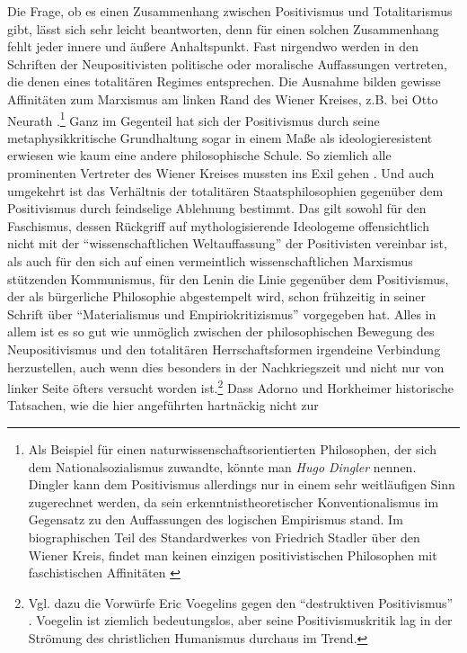 \documentclass[12pt,a4paper,ngerman]{article}
\begin{document}
Die Frage, ob es einen Zusammenhang zwischen Positivismus und
Totalitarismus gibt, lässt sich sehr leicht beantworten, denn für
einen solchen Zusammenhang fehlt jeder innere und äußere Anhaltspunkt.
Fast nirgendwo werden in den Schriften der Neupositivisten politische
oder moralische Auffassungen vertreten, die denen eines totalitären
Regimes entsprechen. Die Ausnahme bilden gewisse Affinitäten zum
Marxismus am linken Rand des Wiener Kreises, z.B. bei Otto Neurath
\cite[S. 43ff.]{cartwright:1996}.\footnote{Als Beispiel für einen
  naturwissenschaftsorientierten Philosophen, der sich dem
  Nationalsozialismus zuwandte, könnte man {\em Hugo Dingler} nennen.
  Dingler kann dem Positivismus allerdings nur in einem sehr
  weitläufigen Sinn zugerechnet werden, da sein
  erkenntnistheoretischer Konventionalismus im Gegensatz zu den
  Auffassungen des logischen Empirismus stand. Im biographischen Teil
  des Standardwerkes von Friedrich Stadler über den Wiener Kreis,
  findet man keinen einzigen positivistischen Philosophen mit
  faschistischen Affinitäten \cite[]{stadler:1997}} Ganz im Gegenteil
hat sich der Positivismus durch seine metaphysikkritische Grundhaltung
sogar in einem Maße als ideologieresistent erwiesen wie kaum eine
andere philosophische Schule. So ziemlich alle prominenten Vertreter
des Wiener Kreises mussten ins Exil gehen \cite[]{stadler:1997}. Und
auch umgekehrt ist das Verhältnis der totalitären Staatsphilosophien
gegenüber dem Positivismus durch feindselige Ablehnung bestimmt. Das
gilt sowohl für den Faschismus, dessen Rückgriff auf mythologisierende
Ideologeme offensichtlich nicht mit der "`wissenschaftlichen
Weltauffassung"' der Positivisten vereinbar ist, als auch für den sich
auf einen vermeintlich wissenschaftlichen Marxismus stützenden
Kommunismus, für den Lenin die Linie gegenüber dem Positivismus, der
als bürgerliche Philosophie abgestempelt wird, schon frühzeitig in
seiner Schrift über "`Materialismus und Empiriokritizismus"'
\cite[]{lenin:1909} vorgegeben hat. Alles in allem ist es so gut wie
unmöglich zwischen der philosophischen Bewegung des Neupositivismus
und den totalitären Herrschaftsformen irgendeine Verbindung
herzustellen, auch wenn dies besonders in der Nachkriegszeit und nicht
nur von linker Seite öfters versucht worden ist.\footnote{Vgl. dazu
  die Vorwürfe Eric Voegelins gegen den "`destruktiven Positivismus"'
  \cite[S. 3ff.]{voegelin:1952}. Voegelin ist ziemlich bedeutungslos,
  aber seine Positivismuskritik lag in der Strömung des christlichen
  Humanismus durchaus im Trend.} Dass Adorno und Horkheimer
historische Tatsachen, wie die hier angeführten hartnäckig nicht zur
\end{document}
